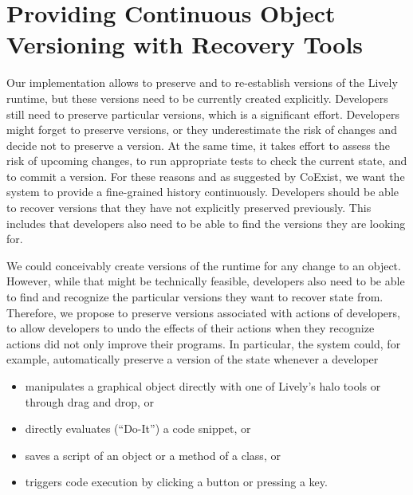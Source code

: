\section{Providing Continuous Object Versioning with Recovery Tools}

Our implementation allows to preserve and to re-establish versions of the Lively runtime, but these versions need to be currently created explicitly.
Developers still need to preserve particular versions, which is a significant effort.
Developers might forget to preserve versions, or they underestimate the risk of changes and decide not to preserve a version.
At the same time, it takes effort to assess the risk of upcoming changes, to run appropriate tests to check the current state, and to commit a version.
For these reasons and as suggested by CoExist, we want the system to provide a fine-grained history continuously.
Developers should be able to recover versions that they have not explicitly preserved previously.
This includes that developers also need to be able to find the versions they are looking for.

We could conceivably create versions of the runtime for any change to an object.
However, while that might be technically feasible, developers also need to be able to find and recognize the particular versions they want to recover state from.
Therefore, we propose to preserve versions associated with actions of developers, to allow developers to undo the effects of their actions when they recognize actions did not only improve their programs.
In particular, the system could, for example, automatically preserve a version of the state whenever a developer
\begin{itemize}
    \item manipulates a graphical object directly with one of Lively's halo tools or through drag and drop, or
    \item directly evaluates (``Do-It'') a code snippet, or
    \item saves a script of an object or a method of a class, or
    \item triggers code execution by clicking a button or pressing a key.
\end{itemize}

